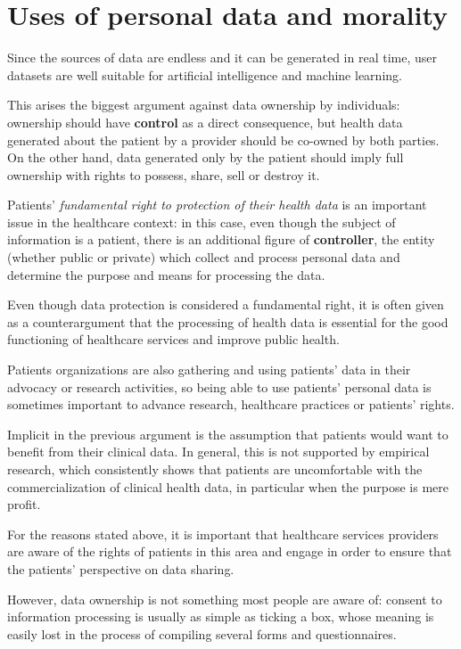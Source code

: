 \documentclass[12pt]{article}
\begin{document}
	\section{Uses of personal data and morality}
	Since the sources of data are endless and it can be generated in real time, user datasets are well suitable for artificial intelligence and machine learning.
	
	This arises the biggest argument against data ownership by individuals: ownership should have \textbf{control} as a direct consequence, but health data generated about the patient by a provider should be co-owned by both parties. On the other hand, data generated only by the patient should imply full ownership with rights to possess, share, sell or destroy it.
	
	Patients’ \textit{fundamental right to protection of their health data} is an important issue in the healthcare context: in this case, even though the subject of information is a patient, there is an additional figure of \textbf{controller}, the entity (whether public or private) which collect and process personal data and determine the purpose and means for processing the data. 
	
	Even though data protection is considered a fundamental right, it is often given as a counterargument that the processing of health data is essential for the good functioning of healthcare services and improve public health\cite{eupatient}. 
	
	Patients organizations are also gathering and using patients’ data in their advocacy or research activities, so being able to use patients’ personal data is sometimes important to advance research, healthcare practices or patients’ rights.
	
	Implicit in the previous argument is the assumption that  patients would want to benefit from their clinical data.  In  general, this is not supported by empirical research, which  consistently shows that patients are uncomfortable  with  the commercialization of clinical health data, in particular when the purpose is mere profit\cite{angela}.
	
	For the reasons stated above, it is important that healthcare services providers are aware of the rights of patients in this area and engage in order to ensure that the patients’ perspective on data sharing. 
	
	However, data ownership is not something most people are aware of: consent to information processing is usually as simple as ticking a box, whose meaning is easily lost in the process of compiling several forms and questionnaires. 
	
\end{document}
